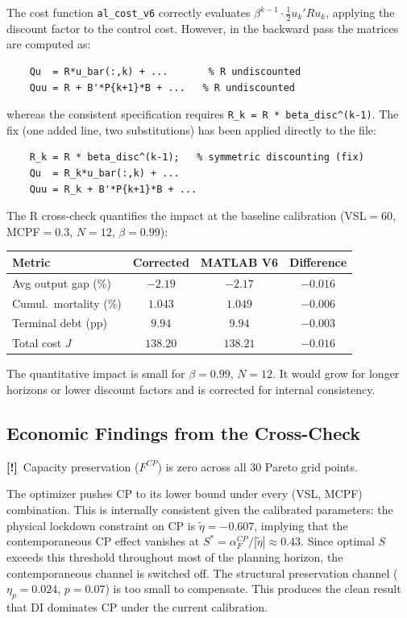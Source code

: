 \documentclass[12pt, a4paper]{article}
\newcommand{\concern}[1]{\textcolor{concern}{\textbf{[!]}~#1}}
\begin{document}
The cost function \texttt{al\_cost\_v6} correctly evaluates
$\beta^{k-1} \cdot \tfrac{1}{2} u_k' R u_k$, applying the discount factor to the
control cost. However, in the backward pass the matrices are computed as:
%
\begin{verbatim}
    Qu  = R*u_bar(:,k) + ...       % R undiscounted
    Quu = R + B'*P{k+1}*B + ...   % R undiscounted
\end{verbatim}
%
whereas the consistent specification requires \texttt{R\_k = R * beta\_disc\^{}(k-1)}.
The fix (one added line, two substitutions) has been applied directly to the file:
%
\begin{verbatim}
    R_k = R * beta_disc^(k-1);   % symmetric discounting (fix)
    Qu  = R_k*u_bar(:,k) + ...
    Quu = R_k + B'*P{k+1}*B + ...
\end{verbatim}

The R cross-check quantifies the impact at the baseline calibration (VSL$=60$,
MCPF$=0.3$, $N=12$, $\beta=0.99$):

\begin{center}
\small
\begin{tabular}{lccc}
\toprule
Metric & Corrected & MATLAB V6 & Difference \\
\midrule
Avg output gap (\%)    & $-2.19$ & $-2.17$ & $-0.016$ \\
Cumul.\ mortality (\%) &  $1.043$ &  $1.049$ & $-0.006$ \\
Terminal debt (pp)     &  $9.94$  &  $9.94$  & $-0.003$ \\
Total cost $J$         & $138.20$ & $138.21$ & $-0.016$ \\
\bottomrule
\end{tabular}
\end{center}

The quantitative impact is small for $\beta=0.99$, $N=12$. It would grow for longer
horizons or lower discount factors and is corrected for internal consistency.

\subsection{Economic Findings from the Cross-Check}

\concern{Capacity preservation ($F^{CP}$) is zero across all 30 Pareto grid points.}

The optimizer pushes CP to its lower bound under every (VSL, MCPF) combination. This is
internally consistent given the calibrated parameters: the physical lockdown constraint
on CP is $\tilde\eta = -0.607$, implying that the contemporaneous CP effect vanishes at
$S^* = \alpha_F^{CP} / |\tilde\eta| \approx 0.43$. Since optimal $S$ exceeds this
threshold throughout most of the planning horizon, the contemporaneous channel is
switched off. The structural preservation channel ($\eta_p = 0.024$, $p = 0.07$) is too
small to compensate. This produces the clean result that DI dominates CP under the
current calibration.
\end{document}
